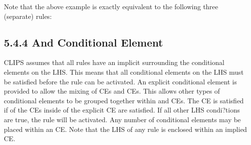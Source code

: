\documentclass[letterpaper,10pt,english]{sphinxmanual}
\begin{document}
Note that the above example is exactly equivalent to the following three
(separate) rules:

\begin{sphinxVerbatim}[commandchars=\\\{\}]
 
   
    
     

 
   
   
     

 
   
  
   
\end{sphinxVerbatim}


\subsection{5.4.4 And Conditional Element}
\label{\detokenize{defrule:and-conditional-element}}
CLIPS assumes that all rules have an implicit   surrounding the conditional elements on the LHS. This means
that all conditional elements on the LHS must be satisfied before the
rule can be activated. An explicit  conditional element is
provided to allow the mixing of  CEs and  CEs. This allows
other types of conditional elements to be grouped together within 
and  CEs. The  CE is satisfied if  of the CEs inside
of the explicit  CE are satisfied. If all other LHS condi?tions
are true, the rule will be activated. Any number of conditional elements
may be placed within an  CE. Note that the LHS of any rule is
enclosed within an implied  CE.
\end{document}
